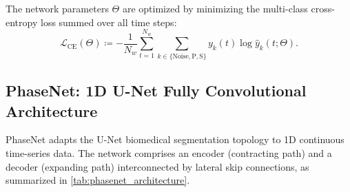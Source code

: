 The network parameters $\Theta$ are optimized by minimizing the
multi-class cross-entropy loss summed over all time steps:
\begin{equation}
  \mathcal{L}_{\mathrm{CE}}(\Theta) \coloneqq - \frac{1}{N_w}
  \sum_{t = 1}^{N_w} \sum_{k \in \{\mathrm{Noise}, \mathrm{P},
  \mathrm{S}\}} y_k(t) \log \hat{y}_k(t; \Theta).
  \label{eq:cross_entropy_loss}
\end{equation}

\subsection{PhaseNet: 1D U-Net Fully Convolutional Architecture}
\ac{PhaseNet} adapts the U-Net biomedical segmentation
topology to 1D continuous time-series data. The network comprises an
encoder (contracting path) and a decoder (expanding path)
interconnected by lateral skip connections, as summarized in
\cref{tab:phasenet_architecture}.

